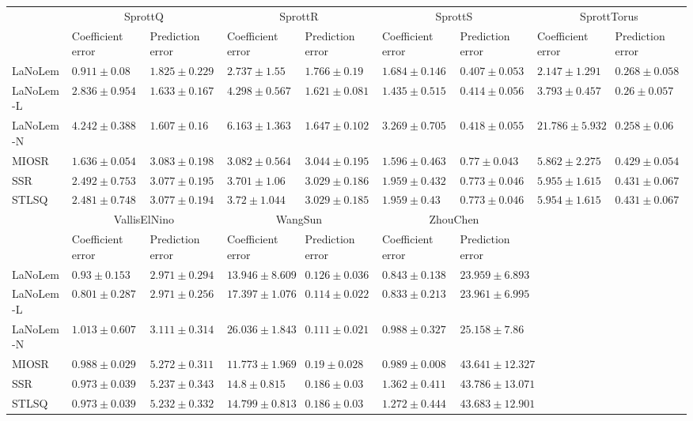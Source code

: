 \begin{table*}
{\begin{tabular}{lllllllll}
 & \multicolumn{2}{c}{SprottQ} & \multicolumn{2}{c}{SprottR} & \multicolumn{2}{c}{SprottS} & \multicolumn{2}{c}{SprottTorus} \\
 & Coefficient error & Prediction error & Coefficient error & Prediction error & Coefficient error & Prediction error & Coefficient error & Prediction error \\
\midrule
LaNoLem & $\mathbf{0.911}\pm 0.08$ & $1.825\pm 0.229$ & $\mathbf{2.737}\pm 1.55$ & $1.766\pm 0.19$ & $1.684\pm 0.146$ & $\mathbf{0.407}\pm 0.053$ & $\mathbf{2.147}\pm 1.291$ & $0.268\pm 0.058$ \\
LaNoLem-L & $2.836\pm 0.954$ & $1.633\pm 0.167$ & $4.298\pm 0.567$ & $\mathbf{1.621}\pm 0.081$ & $\mathbf{1.435}\pm 0.515$ & $0.414\pm 0.056$ & $3.793\pm 0.457$ & $0.26\pm 0.057$ \\
LaNoLem-N & $4.242\pm 0.388$ & $\mathbf{1.607}\pm 0.16$ & $6.163\pm 1.363$ & $1.647\pm 0.102$ & $3.269\pm 0.705$ & $0.418\pm 0.055$ & $21.786\pm 5.932$ & $\mathbf{0.258}\pm 0.06$ \\
MIOSR & $1.636\pm 0.054$ & $3.083\pm 0.198$ & $3.082\pm 0.564$ & $3.044\pm 0.195$ & $1.596\pm 0.463$ & $0.77\pm 0.043$ & $5.862\pm 2.275$ & $0.429\pm 0.054$ \\
SSR & $2.492\pm 0.753$ & $3.077\pm 0.195$ & $3.701\pm 1.06$ & $3.029\pm 0.186$ & $1.959\pm 0.432$ & $0.773\pm 0.046$ & $5.955\pm 1.615$ & $0.431\pm 0.067$ \\
STLSQ & $2.481\pm 0.748$ & $3.077\pm 0.194$ & $3.72\pm 1.044$ & $3.029\pm 0.185$ & $1.959\pm 0.43$ & $0.773\pm 0.046$ & $5.954\pm 1.615$ & $0.431\pm 0.067$ \\

\midrule

 & \multicolumn{2}{c}{VallisElNino} & \multicolumn{2}{c}{WangSun} & \multicolumn{2}{c}{ZhouChen} \\
 & Coefficient error & Prediction error & Coefficient error & Prediction error & Coefficient error & Prediction error \\
\midrule
LaNoLem & $0.93\pm 0.153$ & $2.971\pm 0.294$ & $13.946\pm 8.609$ & $0.126\pm 0.036$ & $0.843\pm 0.138$ & $\mathbf{23.959}\pm 6.893$ \\
LaNoLem-L & $\mathbf{0.801}\pm 0.287$ & $\mathbf{2.971}\pm 0.256$ & $17.397\pm 1.076$ & $0.114\pm 0.022$ & $\mathbf{0.833}\pm 0.213$ & $23.961\pm 6.995$ \\
LaNoLem-N & $1.013\pm 0.607$ & $3.111\pm 0.314$ & $26.036\pm 1.843$ & $\mathbf{0.111}\pm 0.021$ & $0.988\pm 0.327$ & $25.158\pm 7.86$ \\
MIOSR & $0.988\pm 0.029$ & $5.272\pm 0.311$ & $\mathbf{11.773}\pm 1.969$ & $0.19\pm 0.028$ & $0.989\pm 0.008$ & $43.641\pm 12.327$ \\
SSR & $0.973\pm 0.039$ & $5.237\pm 0.343$ & $14.8\pm 0.815$ & $0.186\pm 0.03$ & $1.362\pm 0.411$ & $43.786\pm 13.071$ \\
STLSQ & $0.973\pm 0.039$ & $5.232\pm 0.332$ & $14.799\pm 0.813$ & $0.186\pm 0.03$ & $1.272\pm 0.444$ & $43.683\pm 12.901$ \\

\bottomrule
\end{tabular}
}
\end{table*}
